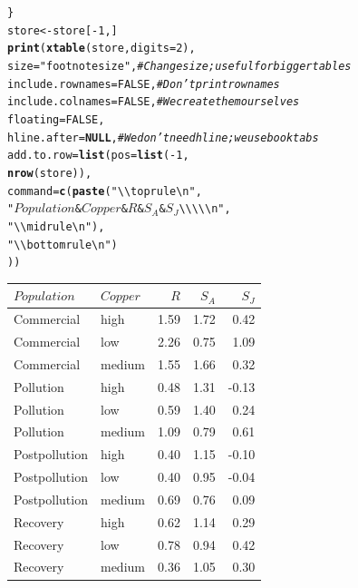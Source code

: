 \documentclass{article}\usepackage[]{graphicx}\usepackage[]{color}
\makeatletter
\newcommand{\hlnum}[1]{\textcolor[rgb]{0.686,0.059,0.569}{#1}}%
\newcommand{\hlstr}[1]{\textcolor[rgb]{0.192,0.494,0.8}{#1}}%
\newcommand{\hlcom}[1]{\textcolor[rgb]{0.678,0.584,0.686}{\textit{#1}}}%
\newcommand{\hlopt}[1]{\textcolor[rgb]{0,0,0}{#1}}%
\newcommand{\hlstd}[1]{\textcolor[rgb]{0.345,0.345,0.345}{#1}}%
\newcommand{\hlkwa}[1]{\textcolor[rgb]{0.161,0.373,0.58}{\textbf{#1}}}%
\newcommand{\hlkwb}[1]{\textcolor[rgb]{0.69,0.353,0.396}{#1}}%
\newcommand{\hlkwc}[1]{\textcolor[rgb]{0.333,0.667,0.333}{#1}}%
\newcommand{\hlkwd}[1]{\textcolor[rgb]{0.737,0.353,0.396}{\textbf{#1}}}%
\newenvironment{kframe}{%
 \def\at@end@of@kframe{}%
 \ifinner\ifhmode%
  \def\at@end@of@kframe{\end{minipage}}%
  \begin{minipage}{\columnwidth}%
 \fi\fi%
 \def\FrameCommand##1{\hskip\@totalleftmargin \hskip-\fboxsep
 \colorbox{shadecolor}{##1}\hskip-\fboxsep
     \hskip-\linewidth \hskip-\@totalleftmargin \hskip\columnwidth}%
 \MakeFramed {\advance\hsize-\width
   \@totalleftmargin\z@ \linewidth\hsize
   \@setminipage}}%
 {\par\unskip\endMakeFramed%
 \at@end@of@kframe}
\makeatother
\begin{document}
\begin{kframe}
\begin{alltt}
\hlstd{\}}
\hlstd{store}\hlkwb{<-}\hlstd{store[}\hlopt{-}\hlnum{1}\hlstd{,]}
\hlkwd{print}\hlstd{(}\hlkwd{xtable}\hlstd{(store,} \hlkwc{digits}\hlstd{=}\hlnum{2}\hlstd{),}
      \hlkwc{size}\hlstd{=}\hlstr{"footnotesize"}\hlstd{,} \hlcom{#Change size; useful for bigger tables}
      \hlkwc{include.rownames}\hlstd{=}\hlnum{FALSE}\hlstd{,} \hlcom{#Don't print rownames}
      \hlkwc{include.colnames}\hlstd{=}\hlnum{FALSE}\hlstd{,} \hlcom{#We create them ourselves}
      \hlkwc{floating}\hlstd{=}\hlnum{FALSE}\hlstd{,}
      \hlkwc{hline.after}\hlstd{=}\hlkwa{NULL}\hlstd{,} \hlcom{#We don't need hline; we use booktabs}
      \hlkwc{add.to.row} \hlstd{=} \hlkwd{list}\hlstd{(}\hlkwc{pos} \hlstd{=} \hlkwd{list}\hlstd{(}\hlopt{-}\hlnum{1}\hlstd{,}
                                   \hlkwd{nrow}\hlstd{(store)),}
                        \hlkwc{command} \hlstd{=} \hlkwd{c}\hlstd{(}\hlkwd{paste}\hlstd{(}\hlstr{"\textbackslash{}\textbackslash{}toprule \textbackslash{}n"}\hlstd{,}
                                          \hlstr{"$Population$ & $Copper$ & $R$ & $S_A$ & $S_J$ \textbackslash{}\textbackslash{}\textbackslash{}\textbackslash{}\textbackslash{}n"}\hlstd{,}
                                          \hlstr{"\textbackslash{}\textbackslash{}midrule \textbackslash{}n"}\hlstd{),}
                                    \hlstr{"\textbackslash{}\textbackslash{}bottomrule \textbackslash{}n"}\hlstd{)}
                        \hlstd{))}
\end{alltt}
\end{kframe}%
{\footnotesize
\begin{tabular}{llrrr}
  \toprule 
 $Population$ & $Copper$ & $R$ & $S_A$ & $S_J$ \\
 \midrule 
 Commercial & high & 1.59 & 1.72 & 0.42 \\ 
  Commercial & low & 2.26 & 0.75 & 1.09 \\ 
  Commercial & medium & 1.55 & 1.66 & 0.32 \\ 
  Pollution & high & 0.48 & 1.31 & -0.13 \\ 
  Pollution & low & 0.59 & 1.40 & 0.24 \\ 
  Pollution & medium & 1.09 & 0.79 & 0.61 \\ 
  Postpollution & high & 0.40 & 1.15 & -0.10 \\ 
  Postpollution & low & 0.40 & 0.95 & -0.04 \\ 
  Postpollution & medium & 0.69 & 0.76 & 0.09 \\ 
  Recovery & high & 0.62 & 1.14 & 0.29 \\ 
  Recovery & low & 0.78 & 0.94 & 0.42 \\ 
  Recovery & medium & 0.36 & 1.05 & 0.30 \\ 
   \bottomrule 
\end{tabular}
}
\end{document}
